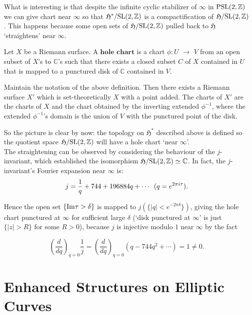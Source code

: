 \documentclass[a4paper,11pt]{article}
\begin{document}
What is interesting is that despite the infinite cyclic stabilizer of $\infty$ in $\textnormal{PSL}(2,\mathbb{Z})$ we can give chart near $\infty$ so that $\mathfrak{H}^*/\textnormal{SL}(2,\mathbb{Z})$ is a compactification of $\mathfrak{H}/\textnormal{SL}(2,\mathbb{Z})$.
This happens because some open sets of $\mathfrak{H}/\textnormal{SL}(2,\mathbb{Z})$ pulled back to $\mathfrak{H}$ `straightens' near $\infty$.

\begin{defn}
Let $X$ be a Riemann surface.
A $\textbf{hole chart}$ is a chart $\phi:U$ $\to$ $V$ from an open subset of $X$'s to $\mathbb{C}$'s such that there exists a closed subset $C$ of $X$ contained in $U$ that is mapped to a punctured disk of $\mathbb{C}$ contained in $V$.
\end{defn}

\begin{lem}
Maintain the notation of the above definition.
Then there exists a Riemann surface $X'$ which is set-theoretically $X$ with a point added.
The charts of $X'$ are the charts of $X$ and the chart obtained by the inverting extended $\phi^{-1}$, where the extended $\phi^{-1}$'s domain is the union of $V$ with the punctured point of the disk.
\end{lem}

So the picture is clear by now: the topology on $\mathfrak{H}^*$ described above is defined so the quotient space $\mathfrak{H}/\textnormal{SL}(2,\mathbb{Z})$ will have a hole chart `near $\infty$'.\\

The straightening can be observed by considering the behaviour of the $j$-invariant, which established the isomorphism $\mathfrak{H}/\textnormal{SL}(2,\mathbb{Z})\simeq\mathbb{C}$.
In fact, the $j$-invariant's Fourier expansion near $\infty$ is:
\[
j=\frac{1}{q}+744+196884q+\cdots \enskip (q=e^{2\pi i\tau}).
\]

Hence the open set $\{\textnormal{Im}\tau>\delta\}$ is mapped to $j(\{|q|<e^{-2\pi\delta}\})$, giving the hole chart punctured at $\infty$ for sufficient large $\delta$
(`disk punctured at $\infty$' is just $\{|z|>R\}$ for some $R>0$), because $j$ is injective modulo $1$ near $\infty$ by the fact

\[
\left(\frac{d}{dq}\right)_{q=0}\frac{1}{j}=\left(\frac{d}{dq}\right)_{q=0}(q-744q^2+\cdots)=1\neq0.
\]



\section{Enhanced Structures on Elliptic Curves}
\end{document}
